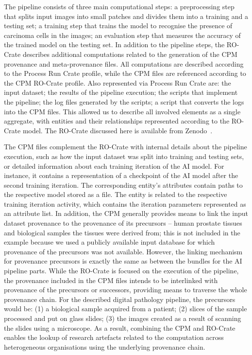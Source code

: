 \documentclass[10pt,letterpaper]{article}
\begin{document}
The pipeline consists of three main computational steps: a preprocessing step that splits input images into small patches and divides them into a training and a testing set; a training step that trains the model to recognise the presence of carcinoma cells in the images; an evaluation step that measures the accuracy of the trained model on the testing set.
In addition to the pipeline steps, the RO-Crate describes additional computations related to the generation of the CPM provenance and meta-provenance files.
All computations are described according to the Process Run Crate profile, while the CPM files are referenced according to the CPM RO-Crate profile. 
Also represented via Process Run Crate are: the input dataset; the results of the pipeline execution; the scripts that implement the pipeline; the log files generated by the scripts; a script that converts the logs into the CPM files.
This allowed us to describe all involved elements as a single aggregate, with entities and their relationships represented according to the RO-Crate model.
The RO-Crate discussed here is available from Zenodo~\cite{Wittner 2023a}.

The CPM files complement the RO-Crate with internal details about the pipeline execution, such as how the input dataset was split into training and testing sets, or detailed information about each training iteration of the AI model.
For instance, it contains a representation of a checkpoint of the AI model after the second training iteration.
The corresponding entity's attributes contain paths to the respective model stored as a file.
The entity is related to the respective training iteration activity, which contains the iteration parameters represented as an attribute list.
In addition, the CPM generally provides means to link the input dataset provenance to the provenance of its precursors -- human prostate tissues and biological samples the tissues were derived from; this is not included in the example because we used a publicly available input database for which provenance of the precursors was not available.
However, the linking mechanism for provenance precursors is exactly the same as between the bundles for the AI pipeline parts.
While the RO-Crate is focused on the execution of the pipeline, the provenance included in the CPM files intends to be interlinked with provenance of the precursors or successors, providing means to traverse the whole provenance chain.
For the described digital pathology pipeline, the precursors would be: (1) a biological sample acquired from a patient; (2) slices of the sample processed and put on glass slides; (3) the images created as a result of scanning the slides using a microscope.
As a result, combining the CPM and RO-Crate enables the lookup of research artefacts related to the computation across heterogeneous organisations using the underlying provenance chain.
\end{document}
